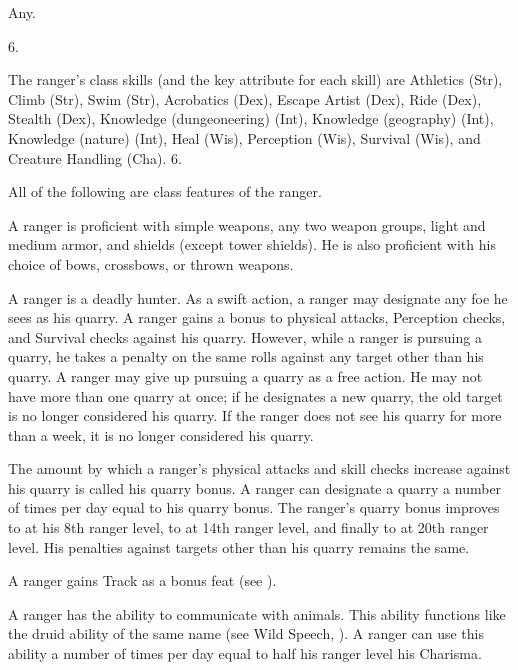  Any.

 6.

The ranger's class skills (and the key attribute for each skill) are Athletics (Str), Climb (Str), Swim (Str), Acrobatics (Dex), Escape Artist (Dex), Ride (Dex), Stealth (Dex), Knowledge (dungeoneering) (Int), Knowledge (geography) (Int), Knowledge (nature) (Int), Heal (Wis), Perception (Wis), Survival (Wis), and Creature Handling (Cha).
 6.


All of the following are class features of the ranger.

  A ranger is proficient with simple weapons, any two weapon groups, light and medium armor, and shields (except tower shields). He is also proficient with his choice of bows, crossbows, or thrown weapons.

 A ranger is a deadly hunter. As a swift action, a ranger may designate any foe he sees as his quarry. A ranger gains a  bonus to physical attacks, Perception checks, and Survival checks against his quarry. However, while a ranger is pursuing a quarry, he takes a  penalty on the same rolls against any target other than his quarry. A ranger may give up pursuing a quarry as a free action. He may not have more than one quarry at once; if he designates a new quarry, the old target is no longer considered his quarry. If the ranger does not see his quarry for more than a week, it is no longer considered his quarry.

\par The amount by which a ranger's physical attacks and skill checks increase against his quarry is called his quarry bonus. A ranger can designate a quarry a number of times per day equal to his quarry bonus. The ranger's quarry bonus improves to  at his 8th ranger level, to  at 14th ranger level, and finally to  at 20th ranger level. His penalties against targets other than his quarry remains the same.

 A ranger gains Track as a bonus feat (see ).

 A ranger has the ability to communicate with animals. This ability functions like the druid ability of the same name (see Wild Speech, ). A ranger can use this ability a number of times per day equal to half his ranger level \add his Charisma.

